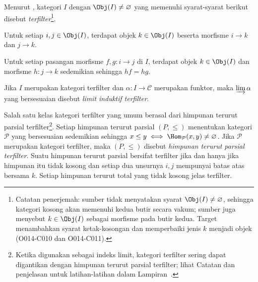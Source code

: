\begin{definisi}
	Menurut \cite[Definisi 2.7.6]{Li1}, kategori $I$ dengan
	$\Obj(I)\neq\emptyset$ yang memenuhi syarat-syarat berikut disebut
	\emph{terfilter}\footnote{Catatan penerjemah: sumber tidak menyatakan syarat
	$\Obj(I)\neq\emptyset$, sehingga kategori kosong akan memenuhi kedua butir
	secara vakum; sumber juga menyebut $k\in\Obj(I)$ sebagai morfisme pada butir
	kedua. Target menambahkan syarat ketak-kosongan dan memperbaiki jenis $k$
	menjadi objek (O014-C010 dan O014-C011).}.
	\begin{compactitem}
		\item Untuk setiap $i, j \in \Obj(I)$, terdapat objek $k \in \Obj(I)$
		beserta morfisme $i \rightarrow k$ dan $j \rightarrow k$.
		\item Untuk setiap pasangan morfisme $f, g: i \to j$ di $I$, terdapat
		objek $k \in \Obj(I)$ dan morfisme $h: j \to k$ sedemikian sehingga
		$hf = hg$.
	\end{compactitem}

	Jika $I$ merupakan kategori terfilter dan $\alpha: I \to \mathcal{C}$
	merupakan funktor, maka $\varinjlim \alpha$ yang bersesuaian disebut
	\emph{limit induktif terfilter}.
\end{definisi}

\begin{contoh}\label{eg:filtered-poset}
	Salah satu kelas kategori terfilter yang umum berasal dari himpunan
	terurut parsial terfilter\footnote{Ketika digunakan sebagai indeks limit,
	kategori terfilter sering dapat digantikan dengan himpunan terurut parsial
	terfilter; lihat Catatan  dan
	penjelasan untuk latihan-latihan dalam
	Lampiran~.}. Setiap himpunan terurut parsial
	$(P, \leq)$ menentukan kategori $\mathcal{P}$ yang bersesuaian sedemikian
	sehingga $x \leq y  \iff \Hom_{\mathcal{P}}(x, y) \neq \emptyset$. Jika
	$\mathcal{P}$ merupakan kategori terfilter, maka $(P, \leq)$ disebut
	\emph{himpunan terurut parsial terfilter}. Suatu himpunan terurut parsial
	bersifat terfilter jika dan hanya jika himpunan itu tidak kosong dan setiap
	dua unsurnya $i, j$ mempunyai batas atas bersama $k$. Setiap himpunan
	terurut total yang tidak kosong jelas terfilter.
\end{contoh}

